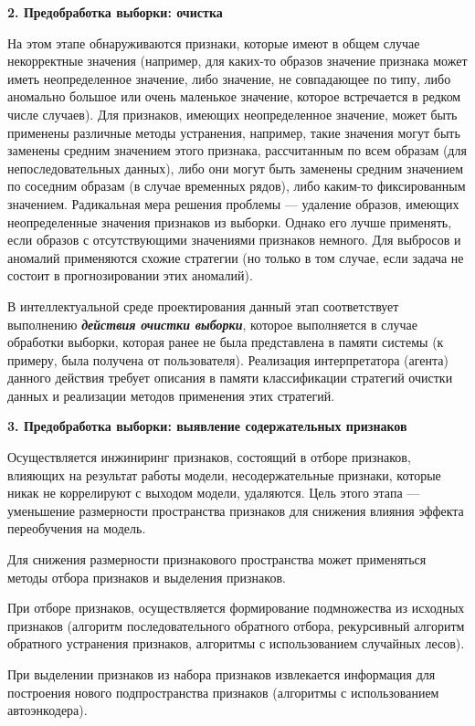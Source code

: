 \textbf{2. Предобработка выборки: очистка}

На этом этапе обнаруживаются признаки, которые имеют в общем случае некорректные значения (например, для каких-то образов значение признака может иметь неопределенное значение, либо значение, не совпадающее по типу, либо аномально большое или очень маленькое значение, которое встречается в редком числе случаев). Для признаков, имеющих неопределенное значение, может быть применены различные методы устранения, например, такие значения могут быть заменены средним значением этого признака, рассчитанным по всем образам (для непоследовательных данных), либо они могут быть заменены средним значением по соседним образам (в случае временных рядов), либо каким-то фиксированным значением. Радикальная мера решения проблемы --- удаление образов, имеющих неопределенные значения признаков из выборки. Однако его лучше применять, если образов с отсутствующими значениями признаков немного. Для выбросов и аномалий применяются схожие стратегии (но только в том случае, если задача не состоит в прогнозировании этих аномалий).

В интеллектуальной среде проектирования данный этап соответствует выполнению \textbf{\textit{действия очистки выборки}}, которое выполняется в случае обработки выборки, которая ранее не была представлена в памяти системы (к примеру, была получена от пользователя).
Реализация интерпретатора (агента) данного действия требует описания в памяти классификации стратегий очистки данных и реализации методов применения этих стратегий.


\textbf{3. Предобработка выборки: выявление содержательных признаков}

Осуществляется инжиниринг признаков, состоящий в отборе признаков, влияющих на результат работы модели, несодержательные признаки, которые никак не коррелируют с выходом модели, удаляются. Цель этого этапа --- уменьшение размерности пространства признаков для снижения влияния эффекта переобучения на модель.

Для снижения размерности признакового пространства может применяться методы отбора признаков и выделения признаков.

При отборе признаков, осуществляется формирование подмножества из исходных признаков (алгоритм последовательного обратного отбора, рекурсивный алгоритм обратного устранения признаков,  алгоритмы с использованием случайных лесов).

При выделении признаков из набора признаков извлекается информация для построения нового подпространства признаков (алгоритмы с использованием автоэнкодера).

